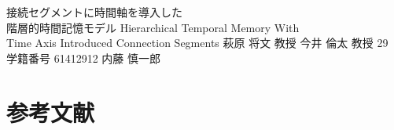 \documentclass[final,a4j,12pt]{jreport}
\begin{document}
\begin{titlepage}
\thesis
{接続セグメントに時間軸を導入した \\ 階層的時間記憶モデル}
{Hierarchical Temporal Memory With \\ Time Axis Introduced Connection Segments}
{萩原 将文 教授}
{今井 倫太 教授}
{29}
{学籍番号 61412912}
{内藤 慎一郎}
\end{titlepage}

\contents










\chapter{参考文献}
\setcounter{page}{35}
\printbibliography[title=参考文献, heading=bibintoc]

\appendix




\end{document}
